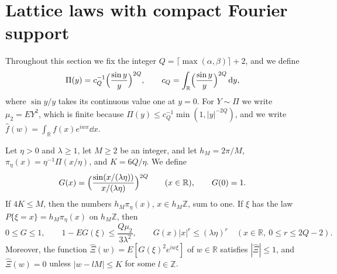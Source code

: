 \section{Lattice laws with compact Fourier support}\label{lat:sec-gate}

Throughout this section we fix the integer
$Q=\lceil\max(\alpha,\beta)\rceil+2$, and we define
\[
 \Pi(y)=c_Q^{-1}\Bigl(\frac{\sin y}{y}\Bigr)^{2Q},\qquad
 c_Q=\int_{\mathbb R}\Bigl(\frac{\sin y}{y}\Bigr)^{2Q}\,\mathrm d y,
\]
where $\sin y/y$ takes its continuous value one at $y=0$. For
$Y\sim\Pi$ we write $\mu_2=EY^2$, which is finite because
$\Pi(y)\le c_Q^{-1}\min(1,|y|^{-2Q})$, and we write
$\widehat f(w)=\int_{\mathbb R}f(x)e^{iwx}\dd x$.

\begin{lemma}\label{lat:gate}
Let $\eta>0$ and $\lambda\ge1$, let $M\ge2$ be an integer, and let
$h_M=2\pi/M$, $\pi_\eta(x)=\eta^{-1}\Pi(x/\eta)$, and $K=6Q/\eta$. We
define
\[
 G(x)=\Bigl(\frac{\sin(x/(\lambda\eta))}{x/(\lambda\eta)}\Bigr)^{2Q}
 \qquad(x\in\mathbb R),\qquad G(0)=1.
\]
If $4K\le M$, then the numbers $h_M\pi_\eta(x)$, $x\in h_M\mathbb Z$,
sum to one. If $\xi$ has the law $P\{\xi=x\}=h_M\pi_\eta(x)$ on
$h_M\mathbb Z$, then
\begin{equation}\label{lat:gate-bounds}
 0\le G\le1,\qquad
 1-EG(\xi)\le\frac{Q\mu_2}{3\lambda^2},\qquad
 G(x)|x|^r\le(\lambda\eta)^r
 \quad(x\in\mathbb R,\ 0\le r\le2Q-2).
\end{equation}
Moreover, the function $\widehat\Xi(w)=E[G(\xi)^2e^{iw\xi}]$ of
$w\in\mathbb R$ satisfies $|\widehat\Xi|\le1$, and $\widehat\Xi(w)=0$
unless $|w-lM|\le K$ for some $l\in\mathbb Z$.
\end{lemma}

